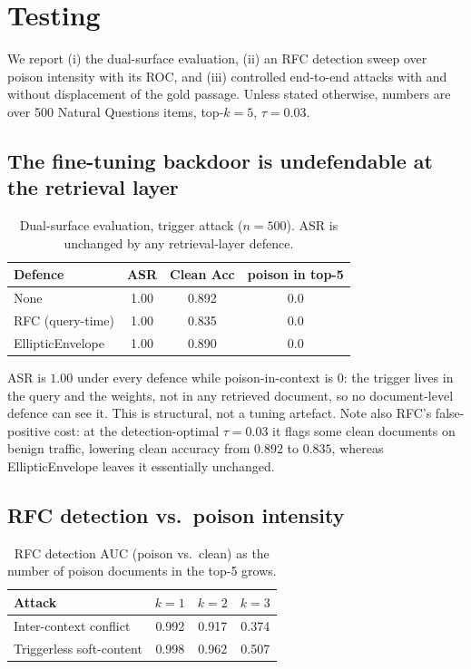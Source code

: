 \documentclass[9pt,a4paper,twoside]{rho-class/rho}
\begin{document}
\section{Testing}

We report (i) the dual-surface evaluation, (ii) an RFC detection sweep over poison intensity with its ROC, and (iii) controlled end-to-end attacks with and without displacement of the gold passage. Unless stated otherwise, numbers are over 500 Natural Questions items, top-$k=5$, $\tau=0.03$.

\subsection{The fine-tuning backdoor is undefendable at the retrieval layer}

\begin{table}[H]
\centering
\caption{Dual-surface evaluation, trigger attack ($n=500$). ASR is unchanged by any retrieval-layer defence.}
\label{tab:backdoor}
\begin{tabular}{lccc}
\hline
\textbf{Defence} & \textbf{ASR} & \textbf{Clean Acc} & \textbf{poison in top-5} \\
\hline
None & 1.00 & 0.892 & 0.0 \\
RFC (query-time) & 1.00 & 0.835 & 0.0 \\
EllipticEnvelope & 1.00 & 0.890 & 0.0 \\
\hline
\end{tabular}
\end{table}

ASR is $1.00$ under every defence while poison-in-context is $0$: the trigger lives in the query and the weights, not in any retrieved document, so no document-level defence can see it. This is structural, not a tuning artefact. Note also RFC's false-positive cost: at the detection-optimal $\tau=0.03$ it flags some clean documents on benign traffic, lowering clean accuracy from $0.892$ to $0.835$, whereas EllipticEnvelope leaves it essentially unchanged.

\subsection{RFC detection vs.\ poison intensity}

\begin{table}[H]
\centering
\caption{RFC detection AUC (poison vs.\ clean) as the number of poison documents in the top-5 grows.}
\label{tab:auc}
\begin{tabular}{lccc}
\hline
\textbf{Attack} & \textbf{$k=1$} & \textbf{$k=2$} & \textbf{$k=3$} \\
\hline
Inter-context conflict & 0.992 & 0.917 & 0.374 \\
Triggerless soft-content & 0.998 & 0.962 & 0.507 \\
\hline
\end{tabular}
\end{table}
\end{document}
